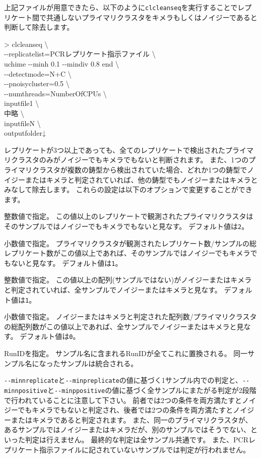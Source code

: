 \documentclass[titlepage,10pt,a4paper,english]{jsbook}
\newenvironment{cmd}{\begin{oframed}\raggedright\ttfamily\footnotesize\setlength{\baselineskip}{1.4em}}{\end{oframed}\vspace{-1em}}
\begin{document}
上記ファイルが用意できたら、以下のように\texttt{clcleanseq}を実行することでレプリケート間で共通しないプライマリクラスタをキメラもしくはノイジーであると判断して除去します。
\begin{cmd}
{\textgreater} clcleanseq {\textbackslash}\\
{-}{-}replicatelist=PCRレプリケート指示ファイル {\textbackslash}\\
uchime {-}{-}minh 0.1 {-}{-}mindiv 0.8 end {\textbackslash}\\
{-}{-}detectmode=N+C {\textbackslash}\\
{-}{-}pnoisycluster=0.5 {\textbackslash}\\
{-}{-}numthreads=NumberOfCPUs {\textbackslash}\\
inputfile1 {\textbackslash}\\
中略 {\textbackslash}\\
inputfileN {\textbackslash}\\
outputfolder↓
\end{cmd}
レプリケートが3つ以上であっても、全てのレプリケートで検出されたプライマリクラスタのみがノイジーでもキメラでもないと判断されます。
また、1つのプライマリクラスタが複数の鋳型から検出されていた場合、どれか1つの鋳型でノイジーまたはキメラと判定されていれば、他の鋳型でもノイジーまたはキメラとみなして除去します。
これらの設定は以下のオプションで変更することができます。
\begin{description}\small\setlength{\baselineskip}{1.1em}
\item[\texttt{{-}{-}minnreplicate}] 整数値で指定。
この値以上のレプリケートで観測されたプライマリクラスタはそのサンプルではノイジーでもキメラでもないと見なす。
デフォルト値は\texttt{2}。
\item[\texttt{{-}{-}minpreplicate}] 小数値で指定。
プライマリクラスタが観測されたレプリケート数/サンプルの総レプリケート数がこの値以上であれば、そのサンプルではノイジーでもキメラでもないと見なす。
デフォルト値は\texttt{1}。
\item[\texttt{{-}{-}minnpositive}] 整数値で指定。
この値以上の配列(サンプルではない)がノイジーまたはキメラと判定されていれば、全サンプルでノイジーまたはキメラと見なす。
デフォルト値は\texttt{1}。
\item[\texttt{{-}{-}minppositive}] 小数値で指定。
ノイジーまたはキメラと判定された配列数/プライマリクラスタの総配列数がこの値以上であれば、全サンプルでノイジーまたはキメラと見なす。
デフォルト値は\texttt{0}。
\item[\texttt{{-}{-}runname}] RunIDを指定。
サンプル名に含まれるRunIDが全てこれに置換される。
同一サンプル名になったサンプルは統合される。
\end{description}
\texttt{{-}{-}minnreplicate}と\texttt{{-}{-}minpreplicate}の値に基づく1サンプル内での判定と、\texttt{{-}{-}minnpositive}と\texttt{{-}{-}minppositive}の値に基づく全サンプルにまたがる判定が2段階で行われていることに注意して下さい。
前者では2つの条件を両方満たすとノイジーでもキメラでもないと判定され、後者では2つの条件を両方満たすとノイジーまたはキメラであると判定されます。
また、同一のプライマリクラスタが、あるサンプルではノイジーまたはキメラだが、別のサンプルではそうでない、といった判定は行えません。
最終的な判定は全サンプル共通です。
また、PCRレプリケート指示ファイルに記されていないサンプルでは判定が行われません。
\end{document}
